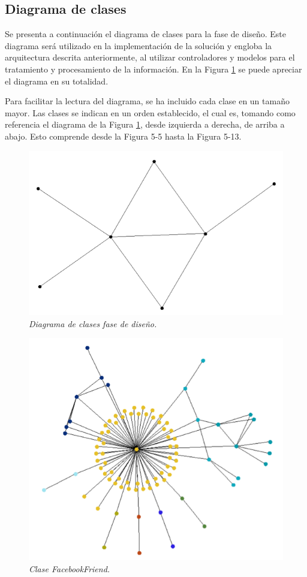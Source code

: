 \subsection{Diagrama de clases}
Se presenta a continuación el diagrama de clases para la fase de diseño. Este diagrama será utilizado en la implementación de la solución y engloba la arquitectura descrita anteriormente, al utilizar controladores y modelos para el tratamiento y procesamiento de la información. En la Figura \ref{fig:des-im4} se puede apreciar el diagrama en su totalidad. 

Para facilitar la lectura del diagrama, se ha incluido cada clase en un tamaño mayor. Las clases se indican en un orden establecido, el cual es, tomando como referencia el diagrama de la Figura \ref{fig:des-im4}, desde izquierda a derecha, de arriba a abajo. Esto comprende desde la Figura 5-5 hasta la Figura 5-13.

\begin{figure}[H]
	\centering
	\includegraphics[scale=.4]{images/Figura5-4}
	\caption{\em Diagrama de clases fase de diseño.}
	\label{fig:des-im4}
\end{figure}

\begin{figure}[H]
	\centering
	\includegraphics[scale=.4]{images/Figura5-5}
	\caption{\em Clase FacebookFriend.}
	\label{fig:des-im5}
\end{figure}

